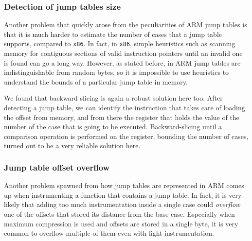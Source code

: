 \documentclass[a4paper,11pt,oneside]{report}
\begin{document}
\subsubsection{Detection of jump tables size}
Another problem that quickly arose from the peculiarities of ARM jump tables is 
that it is much harder to estimate the number of cases that a jump table 
supports, compared to \texttt{x86}. In fact, in \texttt{x86}, simple heuristics 
such as scanning memory for contiguous sections of valid instruction pointers 
until an invalid one is found can go a long way. However, as stated before, in 
ARM jump tables are indistinguishable from random bytes, so it is impossible to 
use heuristics to understand the bounds of a particular jump table in memory.

We found that backward slicing is again a robust solution here too. After 
detecting a jump table, we can identify the instruction that takes care of 
loading the offset from memory, and from there the register that holds the 
value of the number of the case that is going to be executed. Backward-slicing 
until a comparison operation is performed on the register, bounding the number 
of cases, turned out to be a very reliable solution here.  

\subsubsection{Jump table offset overflow}
Another problem spawned from how jump tables are represented in ARM comes up 
when instrumenting a function that contains a jump table. In fact, it is very 
likely that adding too much instrumentation inside a single case could 
\emph{overflow} one of the offsets that stored its distance from the base case.
Especially when maximum compression is used and offsets are stored in a single 
byte, it is very common to overflow multiple of them even with light 
instrumentation. 
\end{document}
